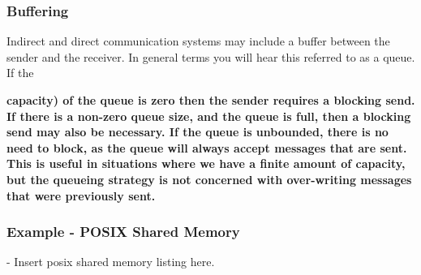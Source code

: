 \documentclass[10pt,a4paper]{article}
\begin{document}
\subsubsection{Buffering}
Indirect and direct communication systems may include a buffer between the sender and the receiver. In general terms you will hear this referred to as a queue. If the {\bf capacity) of the queue is zero then the sender requires a blocking send. If there is a non-zero queue size, and the queue is full, then a blocking send may also be necessary. If the queue is unbounded, there is no need to block, as the queue will always accept messages that are sent. This is useful in situations where we have a finite amount of capacity, but the queueing strategy is not concerned with over-writing messages that were previously sent. 
\subsubsection{Example - POSIX Shared Memory}



\newline\newline - Insert posix shared memory listing here. 

}
\end{document}
